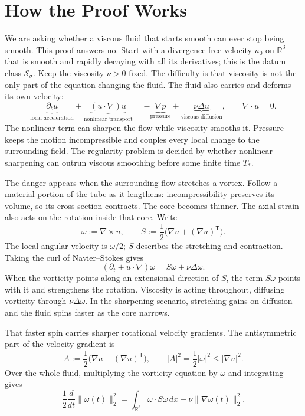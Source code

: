 \begingroup
\setlength{\parindent}{0pt}
\setlength{\parskip}{0.58\baselineskip}
\setlength{\abovedisplayskip}{9pt plus 2pt minus 2pt}
\setlength{\belowdisplayskip}{9pt plus 2pt minus 2pt}
\setlength{\jot}{7pt}

\section*{How the Proof Works}

We are asking whether a viscous fluid that starts smooth can ever stop being
smooth.  This proof answers no.  Start with a divergence-free velocity \(u_0\)
on \(\mathbb R^3\) that is smooth and rapidly decaying with all its derivatives;
this is the datum class \(\mathcal S_\sigma\).  Keep the viscosity \(\nu>0\)
fixed.  The difficulty is that viscosity is not the
only part of the equation changing the fluid.  The fluid also carries and
deforms its own velocity:
\[
\underbrace{\partial_tu}_{\text{local acceleration}}
+\underbrace{(u\!\cdot\nabla)u}_{\text{nonlinear transport}}
=-\underbrace{\nabla p}_{\text{pressure}}
+\underbrace{\nu\Delta u}_{\text{viscous diffusion}},
\qquad \nabla\!\cdot u=0.
\]
The nonlinear term can sharpen the flow while viscosity smooths it.  Pressure
keeps the motion incompressible and couples every local change to the
surrounding field.  The regularity problem is decided by whether nonlinear
sharpening can outrun viscous smoothing before some finite time \(T_*\).

The danger appears when the surrounding flow stretches a vortex.  Follow a
material portion of the tube as it lengthens: incompressibility preserves its
volume, so its cross-section contracts.  The core becomes thinner.  The axial
strain also acts on the rotation inside that core.  Write
\[
\omega:=\nabla\times u,
\qquad
S:=\frac12\bigl(\nabla u+(\nabla u)^{\mathsf T}\bigr).
\]
The local angular velocity is \(\omega/2\); \(S\) describes the stretching
and contraction.  Taking the curl of Navier--Stokes gives
\[
(\partial_t+u\!\cdot\nabla)\omega
=S\omega+\nu\Delta\omega.
\]
When the vorticity points along an extensional direction of \(S\), the term
\(S\omega\) points with it and strengthens the rotation.  Viscosity is acting
throughout, diffusing vorticity through \(\nu\Delta\omega\).  In the sharpening
scenario, stretching gains on diffusion and the fluid spins faster as the
core narrows.

That faster spin carries sharper rotational velocity gradients.  The
antisymmetric part of the velocity gradient is
\[
A:=\frac12\bigl(\nabla u-(\nabla u)^{\mathsf T}\bigr),
\qquad
|A|^2=\frac12|\omega|^2\leq|\nabla u|^2.
\]
Over the whole fluid, multiplying the vorticity equation by \(\omega\) and
integrating gives
\[
\frac12\frac{d}{dt}\|\omega(t)\|_2^2
=\int_{\mathbb R^3}\omega\!\cdot S\omega\,dx
-\nu\|\nabla\omega(t)\|_2^2.
\]

